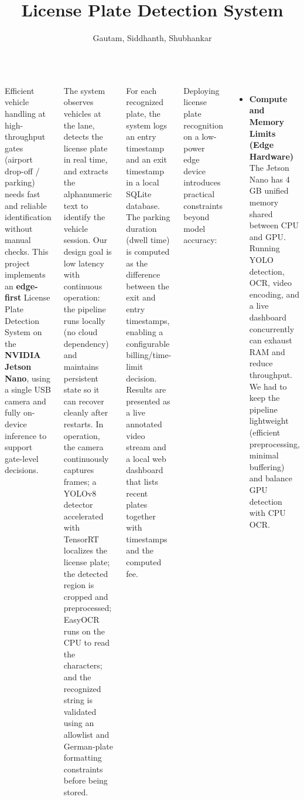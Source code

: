 \documentclass[25pt,a0paper,portrait]{tikzposter}
\title{License Plate Detection System}
\author{Gautam, Siddhanth, Shubhankar}
\begin{document}
	
	\maketitle
	
		\begin{columns}
			
		{
					{
					Efficient vehicle handling at high-throughput gates (airport drop-off / parking) needs fast and reliable identification without manual checks. This project implements an \textbf{edge-first} License Plate Detection System on the \textbf{NVIDIA Jetson Nano}, using a single USB camera and fully on-device inference to support gate-level decisions.\newline
					
						The system observes vehicles at the lane, detects the license plate in real time, and extracts the alphanumeric text to identify the vehicle session. Our design goal is low latency with continuous operation: the pipeline runs locally (no cloud dependency) and maintains persistent state so it can recover cleanly after restarts. In operation, the camera continuously captures frames; a YOLOv8 detector accelerated with TensorRT localizes the license plate; the detected region is cropped and preprocessed; EasyOCR runs on the CPU to read the characters; and the recognized string is validated using an allowlist and German-plate formatting constraints before being stored.\newline
						
						For each recognized plate, the system logs an entry timestamp and an exit timestamp in a local SQLite database. The parking duration (dwell time) is computed as the difference between the exit and entry timestamps, enabling a configurable billing/time-limit decision. Results are presented as a live annotated video stream and a local web dashboard that lists recent plates together with timestamps and the computed fee.
						
					}
				
				{
				Deploying license plate recognition on a low-power edge device introduces practical constraints beyond model accuracy:\newline
				
					\begin{itemize}
						\item \textbf{Compute and Memory Limits (Edge Hardware)}\\
						The Jetson Nano has 4\,GB unified memory shared between CPU and GPU. Running YOLO detection, OCR, video encoding, and a live dashboard concurrently can exhaust RAM and reduce throughput. We had to keep the pipeline lightweight (efficient preprocessing, minimal buffering) and balance GPU detection with CPU OCR.\newline
						

\end{itemize}}}
\end{columns}
\end{document}
